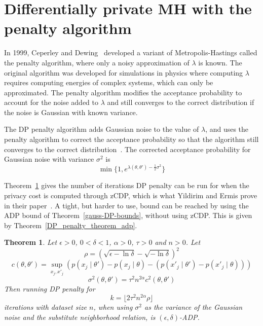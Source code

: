 \documentclass[english,twoside,openright]{HYgraduMLDS}
\newtheorem{theorem}{Theorem}
\begin{document}
\section{Differentially private MH with the penalty algorithm}\label{dp_penalty_section}

In 1999, Ceperley and Dewing~\cite{CeD99} developed a variant of 
Metropolis-Hastings called the penalty 
algorithm, where only a noisy approximation of \(\lambda\) is known. The
original algorithm was
developed for simulations in physics where computing \(\lambda\)
requires computing energies of complex systems, which can only be approximated.
The penalty algorithm modifies the acceptance probability to account for the 
noise added to \(\lambda\) and still converges to the correct distribution if 
the noise is Gaussian with known variance.

The DP penalty algorithm adds Gaussian noise to the value of \(\lambda\), and 
uses the penalty algorithm to correct the acceptance probability so that 
the algorithm still converges to the correct distribution~\cite{YildirimE19}.
The corrected acceptance probability for Gaussian noise with variance 
\(\sigma^2\) is 
\[
    \min\{1, e^{\lambda(\theta, \theta') - \frac{1}{2}\sigma^2}\}
\]

Theorem~\ref{DP_penalty_theorem_zcdp} gives the number of iterations DP penalty 
can be run for when the privacy cost is computed through zCDP, which is 
what Yildirim and Ermis prove in their paper~\cite{YildirimE19}. A tight, but
harder to use, bound can be reached by using the ADP bound of
Theorem~\ref{gauss-DP-bounds}, without using zCDP. This is given by
Theorem~\ref{DP_penalty_theorem_adp}.

\begin{theorem}\label{DP_penalty_theorem_zcdp}
  Let \(\epsilon > 0\), \(0 < \delta < 1\), \(\alpha > 0\), \(\tau > 0\) and
  \(n > 0\).
    Let
    \[
        \rho = (\sqrt{\epsilon - \ln \delta} - \sqrt{-\ln \delta})^2
    \]
    \[
        c(\theta, \theta') = \sup_{x_j, x'_j} (p(x_j\mid \theta') - p(x_j\mid \theta) 
        - (p(x'_j\mid \theta') - p(x'_j\mid \theta)))
    \]
    \[
        \sigma^2(\theta, \theta') = \tau^2 n^{2\alpha}c^2(\theta, \theta')
    \]
    Then running DP penalty for
    \[
        k = \lfloor 2\tau^2 n^{2\alpha} \rho\rfloor
    \]
    iterations with dataset size \(n\), when using \(\sigma^2\) as the
    variance of the Gaussian noise
    and the substitute neighborhood relation, is \((\epsilon, \delta)\)-ADP.
\end{theorem}
\end{document}
